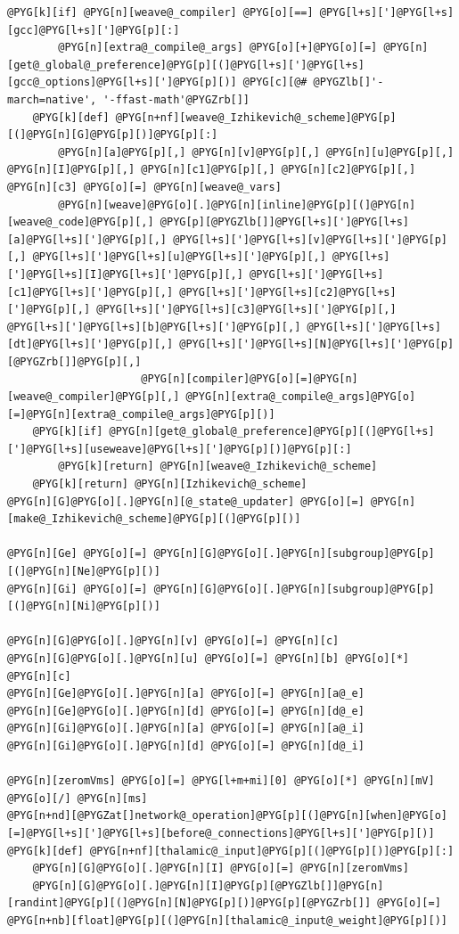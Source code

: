 \documentclass[letterpaper,10pt,english]{manual}
\begin{document}
\begin{Verbatim}[commandchars=@\[\]]
    @PYG[k][if] @PYG[n][weave@_compiler] @PYG[o][==] @PYG[l+s][']@PYG[l+s][gcc]@PYG[l+s][']@PYG[p][:]
        @PYG[n][extra@_compile@_args] @PYG[o][+]@PYG[o][=] @PYG[n][get@_global@_preference]@PYG[p][(]@PYG[l+s][']@PYG[l+s][gcc@_options]@PYG[l+s][']@PYG[p][)] @PYG[c][@# @PYGZlb[]'-march=native', '-ffast-math'@PYGZrb[]]
    @PYG[k][def] @PYG[n+nf][weave@_Izhikevich@_scheme]@PYG[p][(]@PYG[n][G]@PYG[p][)]@PYG[p][:]
        @PYG[n][a]@PYG[p][,] @PYG[n][v]@PYG[p][,] @PYG[n][u]@PYG[p][,] @PYG[n][I]@PYG[p][,] @PYG[n][c1]@PYG[p][,] @PYG[n][c2]@PYG[p][,] @PYG[n][c3] @PYG[o][=] @PYG[n][weave@_vars]
        @PYG[n][weave]@PYG[o][.]@PYG[n][inline]@PYG[p][(]@PYG[n][weave@_code]@PYG[p][,] @PYG[p][@PYGZlb[]]@PYG[l+s][']@PYG[l+s][a]@PYG[l+s][']@PYG[p][,] @PYG[l+s][']@PYG[l+s][v]@PYG[l+s][']@PYG[p][,] @PYG[l+s][']@PYG[l+s][u]@PYG[l+s][']@PYG[p][,] @PYG[l+s][']@PYG[l+s][I]@PYG[l+s][']@PYG[p][,] @PYG[l+s][']@PYG[l+s][c1]@PYG[l+s][']@PYG[p][,] @PYG[l+s][']@PYG[l+s][c2]@PYG[l+s][']@PYG[p][,] @PYG[l+s][']@PYG[l+s][c3]@PYG[l+s][']@PYG[p][,] @PYG[l+s][']@PYG[l+s][b]@PYG[l+s][']@PYG[p][,] @PYG[l+s][']@PYG[l+s][dt]@PYG[l+s][']@PYG[p][,] @PYG[l+s][']@PYG[l+s][N]@PYG[l+s][']@PYG[p][@PYGZrb[]]@PYG[p][,]
                     @PYG[n][compiler]@PYG[o][=]@PYG[n][weave@_compiler]@PYG[p][,] @PYG[n][extra@_compile@_args]@PYG[o][=]@PYG[n][extra@_compile@_args]@PYG[p][)]
    @PYG[k][if] @PYG[n][get@_global@_preference]@PYG[p][(]@PYG[l+s][']@PYG[l+s][useweave]@PYG[l+s][']@PYG[p][)]@PYG[p][:]
        @PYG[k][return] @PYG[n][weave@_Izhikevich@_scheme]
    @PYG[k][return] @PYG[n][Izhikevich@_scheme]
@PYG[n][G]@PYG[o][.]@PYG[n][@_state@_updater] @PYG[o][=] @PYG[n][make@_Izhikevich@_scheme]@PYG[p][(]@PYG[p][)]

@PYG[n][Ge] @PYG[o][=] @PYG[n][G]@PYG[o][.]@PYG[n][subgroup]@PYG[p][(]@PYG[n][Ne]@PYG[p][)]
@PYG[n][Gi] @PYG[o][=] @PYG[n][G]@PYG[o][.]@PYG[n][subgroup]@PYG[p][(]@PYG[n][Ni]@PYG[p][)]

@PYG[n][G]@PYG[o][.]@PYG[n][v] @PYG[o][=] @PYG[n][c]
@PYG[n][G]@PYG[o][.]@PYG[n][u] @PYG[o][=] @PYG[n][b] @PYG[o][*] @PYG[n][c]
@PYG[n][Ge]@PYG[o][.]@PYG[n][a] @PYG[o][=] @PYG[n][a@_e]
@PYG[n][Ge]@PYG[o][.]@PYG[n][d] @PYG[o][=] @PYG[n][d@_e]
@PYG[n][Gi]@PYG[o][.]@PYG[n][a] @PYG[o][=] @PYG[n][a@_i]
@PYG[n][Gi]@PYG[o][.]@PYG[n][d] @PYG[o][=] @PYG[n][d@_i]

@PYG[n][zeromVms] @PYG[o][=] @PYG[l+m+mi][0] @PYG[o][*] @PYG[n][mV] @PYG[o][/] @PYG[n][ms]
@PYG[n+nd][@PYGZat[]network@_operation]@PYG[p][(]@PYG[n][when]@PYG[o][=]@PYG[l+s][']@PYG[l+s][before@_connections]@PYG[l+s][']@PYG[p][)]
@PYG[k][def] @PYG[n+nf][thalamic@_input]@PYG[p][(]@PYG[p][)]@PYG[p][:]
    @PYG[n][G]@PYG[o][.]@PYG[n][I] @PYG[o][=] @PYG[n][zeromVms]
    @PYG[n][G]@PYG[o][.]@PYG[n][I]@PYG[p][@PYGZlb[]]@PYG[n][randint]@PYG[p][(]@PYG[n][N]@PYG[p][)]@PYG[p][@PYGZrb[]] @PYG[o][=] @PYG[n+nb][float]@PYG[p][(]@PYG[n][thalamic@_input@_weight]@PYG[p][)]


\end{Verbatim}
\end{document}
